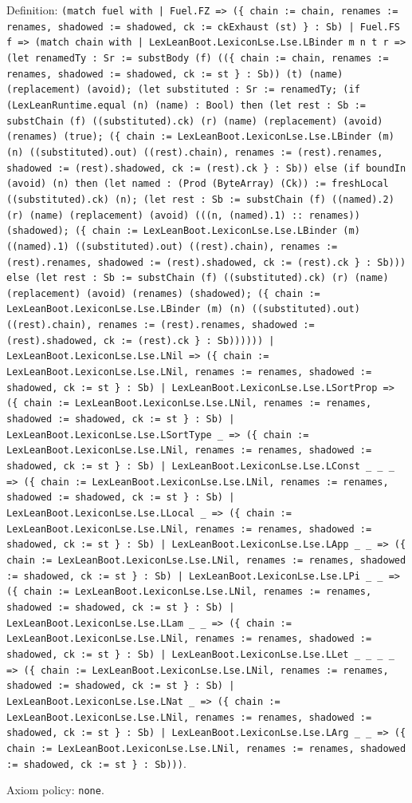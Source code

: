 \documentclass[11pt]{article}
\begin{document}
\noindent Definition: \texttt{(match fuel with | Fuel.FZ => (\{ chain := chain, renames := renames, shadowed := shadowed, ck := ckExhaust (st) \} : Sb) | Fuel.FS f => (match chain with | LexLeanBoot.LexiconLse.Lse.LBinder m n t r => (let renamedTy : Sr := substBody (f) ((\{ chain := chain, renames := renames, shadowed := shadowed, ck := st \} : Sb)) (t) (name) (replacement) (avoid); (let substituted : Sr := renamedTy; (if (LexLeanRuntime.equal (n) (name) : Bool) then (let rest : Sb := substChain (f) ((substituted).ck) (r) (name) (replacement) (avoid) (renames) (true); (\{ chain := LexLeanBoot.LexiconLse.Lse.LBinder (m) (n) ((substituted).out) ((rest).chain), renames := (rest).renames, shadowed := (rest).shadowed, ck := (rest).ck \} : Sb)) else (if boundIn (avoid) (n) then (let named : (Prod (ByteArray) (Ck)) := freshLocal ((substituted).ck) (n); (let rest : Sb := substChain (f) ((named).2) (r) (name) (replacement) (avoid) (((n, (named).1) :: renames)) (shadowed); (\{ chain := LexLeanBoot.LexiconLse.Lse.LBinder (m) ((named).1) ((substituted).out) ((rest).chain), renames := (rest).renames, shadowed := (rest).shadowed, ck := (rest).ck \} : Sb))) else (let rest : Sb := substChain (f) ((substituted).ck) (r) (name) (replacement) (avoid) (renames) (shadowed); (\{ chain := LexLeanBoot.LexiconLse.Lse.LBinder (m) (n) ((substituted).out) ((rest).chain), renames := (rest).renames, shadowed := (rest).shadowed, ck := (rest).ck \} : Sb)))))) | LexLeanBoot.LexiconLse.Lse.LNil => (\{ chain := LexLeanBoot.LexiconLse.Lse.LNil, renames := renames, shadowed := shadowed, ck := st \} : Sb) | LexLeanBoot.LexiconLse.Lse.LSortProp => (\{ chain := LexLeanBoot.LexiconLse.Lse.LNil, renames := renames, shadowed := shadowed, ck := st \} : Sb) | LexLeanBoot.LexiconLse.Lse.LSortType \_ => (\{ chain := LexLeanBoot.LexiconLse.Lse.LNil, renames := renames, shadowed := shadowed, ck := st \} : Sb) | LexLeanBoot.LexiconLse.Lse.LConst \_ \_ \_ => (\{ chain := LexLeanBoot.LexiconLse.Lse.LNil, renames := renames, shadowed := shadowed, ck := st \} : Sb) | LexLeanBoot.LexiconLse.Lse.LLocal \_ => (\{ chain := LexLeanBoot.LexiconLse.Lse.LNil, renames := renames, shadowed := shadowed, ck := st \} : Sb) | LexLeanBoot.LexiconLse.Lse.LApp \_ \_ => (\{ chain := LexLeanBoot.LexiconLse.Lse.LNil, renames := renames, shadowed := shadowed, ck := st \} : Sb) | LexLeanBoot.LexiconLse.Lse.LPi \_ \_ => (\{ chain := LexLeanBoot.LexiconLse.Lse.LNil, renames := renames, shadowed := shadowed, ck := st \} : Sb) | LexLeanBoot.LexiconLse.Lse.LLam \_ \_ => (\{ chain := LexLeanBoot.LexiconLse.Lse.LNil, renames := renames, shadowed := shadowed, ck := st \} : Sb) | LexLeanBoot.LexiconLse.Lse.LLet \_ \_ \_ \_ => (\{ chain := LexLeanBoot.LexiconLse.Lse.LNil, renames := renames, shadowed := shadowed, ck := st \} : Sb) | LexLeanBoot.LexiconLse.Lse.LNat \_ => (\{ chain := LexLeanBoot.LexiconLse.Lse.LNil, renames := renames, shadowed := shadowed, ck := st \} : Sb) | LexLeanBoot.LexiconLse.Lse.LArg \_ \_ => (\{ chain := LexLeanBoot.LexiconLse.Lse.LNil, renames := renames, shadowed := shadowed, ck := st \} : Sb)))}.\par
\noindent Axiom policy: \texttt{none}.\par
\end{document}
